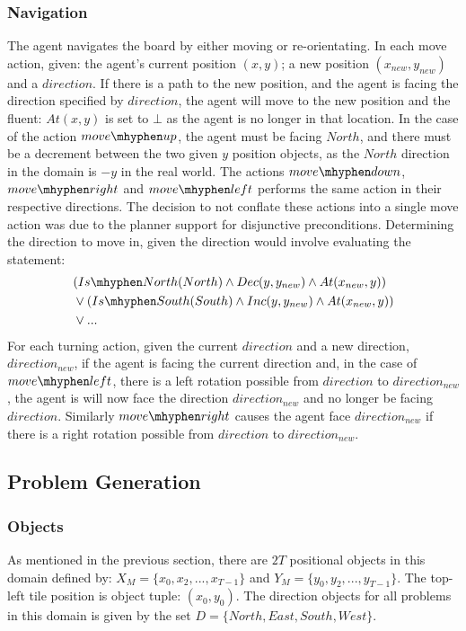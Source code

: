 \subsubsection{Navigation}
The agent navigates the board by either moving or re-orientating. In each move action, given: the agent's current position $(x, y)$; a new position $(x_{new}, y_{new})$ and a $direction$. If there is a path to the new position, and the agent is facing the direction specified by $direction$, the agent will move to the new position and the fluent: $At(x, y)$ is set to $\bot$ as the agent is no longer in that location. In the case of the action $move\mhyphen up$, the agent must be facing $North$, and there must be a decrement between the two given $y$ position objects, as the $North$ direction in the domain is $-y$ in the real world. The actions $move\mhyphen down$, $move\mhyphen right$ and $move\mhyphen left$ performs the same action in their respective directions. The decision to not conflate these actions into a single move action was due to the planner support for disjunctive preconditions. Determining the direction to move in, given the direction would involve evaluating the statement: 
\begin{align*}
    &(Is\mhyphen North(North) \land Dec(y, y_{new}) \land At (x_{new}, y))\\
    &\lor (Is\mhyphen South(South) \land Inc(y, y_{new}) \land At(x_{new}, y))\\
    &\lor ...
\end{align*}
For each turning action, given the current $direction$ and a new direction, $direction_{new}$, if the agent is facing the current direction and, in the case of $move\mhyphen left$, there is a left rotation possible from $direction$ to $direction_{new}$, the agent is will now face the direction $direction_{new}$ and no longer be facing $direction$. Similarly $move\mhyphen right$ causes the agent face $direction_{new}$ if there is a right rotation possible from $direction$ to $direction_{new}$.

\subsection{Problem Generation}

\subsubsection{Objects}
As mentioned in the previous section, there are $2T$ positional objects in this domain defined by: $X_M = \{x_0, x_2, ..., x_{T-1}\}$ and $Y_M = \{y_0, y_2, ..., y_{T-1}\}$. The top-left tile position is object tuple: $(x_0, y_0)$. The direction objects for all problems in this domain is given by the set $D = \{North, East, South, West\}$.

